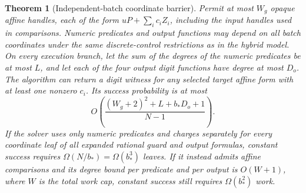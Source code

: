 \documentclass[11pt]{article}
\newtheorem{theorem}{Theorem}
\begin{document}
\begin{theorem}[Independent-batch coordinate barrier]
Permit at most \(W_g\) opaque affine handles, each of the form \(uP+\sum_i c_iZ_i\), including the input handles used in comparisons. Numeric predicates and output functions may depend on all batch coordinates under the same discrete-control restrictions as in the hybrid model. On every execution branch, let the sum of the degrees of the numeric predicates be at most \(L\), and let each of the four output digit functions have degree at most \(D_o\). The algorithm can return a digit witness for any selected target affine form with at least one nonzero \(c_i\). Its success probability is at most
\[
  O\!\left(\frac{(W_g+2)^2+L+b_* D_o+1}{N-1}\right).
\tag{13}
\]
If the solver uses only numeric predicates and charges separately for every coordinate leaf of all expanded rational guard and output formulas, constant success requires \(\Omega(N/b_*)=\Omega(b_*^3)\) leaves. If it instead admits affine comparisons and its degree bound per predicate and per output is \(O(W+1)\), where \(W\) is the total work cap, constant success still requires \(\Omega(b_*^2)\) work.
\end{theorem}
\end{document}
